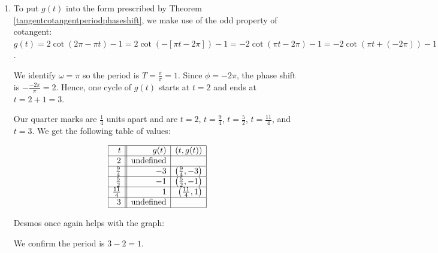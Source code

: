 \documentclass{ximera}
\begin{document}
\begin{example}
\begin{explanation}
\begin{enumerate}
We use desmos to help us produce the graph below

\begin{center}
\end{center}

We confirm that the period is $3\pi - \pi = 2\pi$.

\item  To put $g(t)$ into the form prescribed by Theorem \ref{tangentcotangentperiodphaseshift}, we make use of the odd property of cotangent:  $g(t) = 2\cot\left(2\pi - \pi t \right) - 1 = 2\cot( -[\pi t- 2\pi]) - 1 = -2 \cot(\pi t- 2\pi) - 1= -2 \cot(\pi t + (- 2\pi)) - 1$.



We identify $\omega = \pi$ so the period is $T = \frac{\pi}{\pi} = 1$.  Since $\phi = -2\pi$, the phase shift is $-\frac{-2\pi}{\pi} = 2$.  Hence, one cycle of $g(t)$ starts at $t = 2$ and ends at $t = 2+1 = 3$.  



Our quarter marks are $\frac{1}{4}$ units apart and are $t = 2$, $t = \frac{9}{4}$, $t = \frac{5}{2}$, $t = \frac{11}{4}$, and $t = 3$.  We get the following table of values:




\[ \begin{array}{|r||r|r|} \hline
t & g(t) & (t,g(t))  \\ \hline
2  & \text{undefined} &   \\ \hline
\frac{9}{4}  &  -3 &  \left(\frac{9}{4}, -3 \right) \\ \hline 
\frac{5}{2} & -1 &  \left( \frac{5}{2}, -1 \right)  \\ \hline 
\frac{11}{4}  & 1 &  \left(\frac{11}{4}, 1 \right) \\ \hline 
3 & \text{undefined} &  \\ \hline 
\end{array} \]

Desmos once again helps with the graph:

\begin{center}
\end{center}

We confirm the period is $3-2 = 1$.

\end{enumerate}
\end{explanation}
\end{example}
\end{document}
